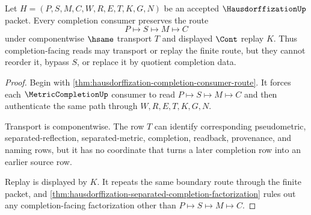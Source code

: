 \begin{theorem}
\label{thm:hausdorffization-completion-route-stability}
Let $H=(P,S,M,C,W,R,E,T,K,G,N)$ be an accepted $\HausdorffizationUp$ packet. Every completion consumer preserves the route
$$
P \longmapsto S \longmapsto M \longmapsto C
$$
under componentwise $\hsame$ transport $T$ and displayed $\Cont$ replay $K$. Thus completion-facing reads may transport or replay the finite route, but they cannot reorder it, bypass $S$, or replace it by quotient completion data.
\end{theorem}
\begin{proof}
Begin with \autoref{thm:hausdorffization-completion-consumer-route}. It forces each $\MetricCompletionUp$ consumer to read $P \longmapsto S \longmapsto M \longmapsto C$ and then authenticate the same path through $W,R,E,T,K,G,N$.

Transport is componentwise. The row $T$ can identify corresponding pseudometric, separated-reflection, separated-metric, completion, readback, provenance, and naming rows, but it has no coordinate that turns a later completion row into an earlier source row.

Replay is displayed by $K$. It repeats the same boundary route through the finite packet, and \autoref{thm:hausdorffization-separated-completion-factorization} rules out any completion-facing factorization other than $P \longmapsto S \longmapsto M \longmapsto C$.
\end{proof}

